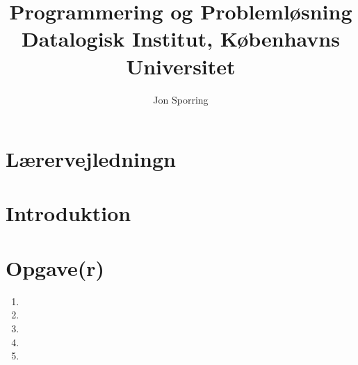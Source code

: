 \documentclass[a4paper,12pt]{article}
\title{Programmering og Problemløsning\\Datalogisk Institut,
  Københavns Universitet}
\author{Jon Sporring}
\begin{document}
\maketitle

\section{Lærervejledningn}

\section{Introduktion}

\section{Opgave(r)}
\begin{enumerate}
\item 
\item 
\item 
\item 
\item 
\end{enumerate}
\end{document}

